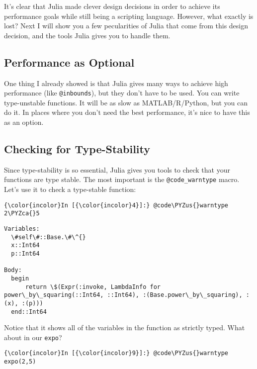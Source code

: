 \documentclass[11pt]{article}
\def\PYZus{\char`\_}
\def\PYZca{\char`\^}
\begin{document}
It's clear that Julia made clever design decisions in order to achieve
its performance goals while still being a scripting language. However,
what exactly is lost? Next I will show you a few pecularities of Julia
that come from this design decision, and the tools Julia gives you to
handle them.

    \subsection{Performance as Optional}\label{performance-as-optional}

One thing I already showed is that Julia gives many ways to achieve high
performance (like \texttt{@inbounds}), but they don't have to be used.
You can write type-unstable functions. It will be as slow as
MATLAB/R/Python, but you can do it. In places where you don't need the
best performance, it's nice to have this as an option.

    \subsection{Checking for
Type-Stability}\label{checking-for-type-stability}

Since type-stability is so essential, Julia gives you tools to check
that your functions are type stable. The most important is the
\texttt{@code\_warntype} macro. Let's use it to check a type-stable
function:

    \begin{Verbatim}[commandchars=\\\{\}]
{\color{incolor}In [{\color{incolor}4}]:} @code\PYZus{}warntype 2\PYZca{}5
\end{Verbatim}

    \begin{Verbatim}[commandchars=\\\{\}]
Variables:
  \#self\#::Base.\#\^{}
  x::Int64
  p::Int64

Body:
  begin 
      return \$(Expr(:invoke, LambdaInfo for power\_by\_squaring(::Int64, ::Int64), :(Base.power\_by\_squaring), :(x), :(p)))
  end::Int64

    \end{Verbatim}

    Notice that it shows all of the variables in the function as strictly
typed. What about in our \texttt{expo}?

    \begin{Verbatim}[commandchars=\\\{\}]
{\color{incolor}In [{\color{incolor}9}]:} @code\PYZus{}warntype expo(2,5)
\end{Verbatim}
\end{document}

